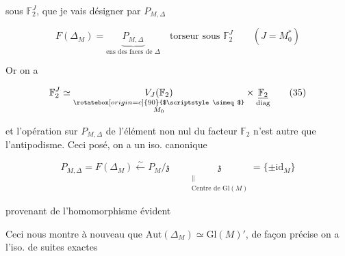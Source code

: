 sous $\mathbb F_2^J$, que je vais désigner par $P_{M,\Delta}$

\[
 F(\Delta_M)=\underbrace{P_{M,\Delta}}_{\text{ens des faces de }\Delta}
 \quad\text{torseur sous }\mathbb F_2^J\qquad(J=M_0^*) \tag*{(34)}
\]

Or on a

\[
 \mathbb F_2^J\simeq\underset{\substack{\rotatebox[origin=c]{90}{$\scriptstyle\simeq$}\\ M_0}}{V_J(\mathbb F_2)}\times
 \underset{\text{diag}}{\underline{\mathbb F_2}}\tag*{(35)}
\]

et l'opération sur $P_{M,\Delta}$ de l'élément non nul  du facteur $\mathbb F_2$ n'est autre que l'antipodisme. Ceci posé, on a un iso. canonique

\[
 P_{M,\Delta}=F(\Delta_M)\xleftarrow{\sim}P_M/\mathfrak z
 \qquad\underset{\substack{\|\\\text{Centre de }\mathrm{Gl}(M)}}{\mathfrak z}
 =\{\pm\mathrm{id}_M\}\tag*{(36)}
\]

provenant de l’homomorphisme évident


Ceci nous montre à nouveau que $\mathrm{Aut}(\Delta_M)\simeq\mathrm{Gl}(M)'$, de façon précise on a l'iso. de suites exactes


